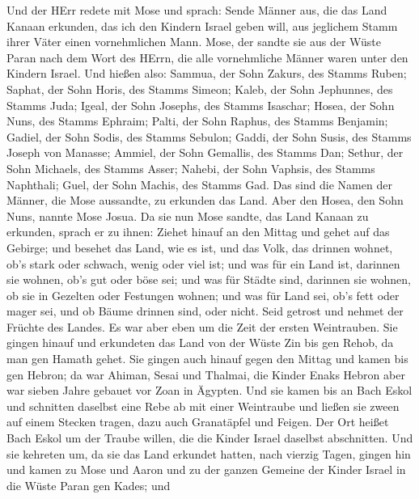  Und der HErr redete mit Mose und sprach:  Sende
Männer aus, die das Land Kanaan erkunden, das ich den Kindern Israel
geben will, aus jeglichem Stamm ihrer Väter einen vornehmlichen Mann.
 Mose, der sandte sie aus der Wüste Paran nach dem Wort des
HErrn, die alle vornehmliche Männer waren unter den Kindern Israel.
 Und hießen also: Sammua, der Sohn Zakurs, des Stamms Ruben;
 Saphat, der Sohn Horis, des Stamms Simeon; 
Kaleb, der Sohn Jephunnes, des Stamms Juda;  Igeal, der Sohn
Josephs, des Stamms Isaschar;  Hosea, der Sohn Nuns, des
Stamms Ephraim;  Palti, der Sohn Raphus, des Stamms
Benjamin;  Gadiel, der Sohn Sodis, des Stamms Sebulon;
 Gaddi, der Sohn Susis, des Stamms Joseph von Manasse;
 Ammiel, der Sohn Gemallis, des Stamms Dan; 
Sethur, der Sohn Michaels, des Stamms Asser;  Nahebi, der
Sohn Vaphsis, des Stamms Naphthali;  Guel, der Sohn Machis,
des Stamms Gad.  Das sind die Namen der Männer, die Mose
aussandte, zu erkunden das Land. Aber den Hosea, den Sohn Nuns, nannte
Mose Josua.  Da sie nun Mose sandte, das Land Kanaan zu
erkunden, sprach er zu ihnen: Ziehet hinauf an den Mittag und gehet auf
das Gebirge;  und besehet das Land, wie es ist, und das
Volk, das drinnen wohnet, ob's stark oder schwach, wenig oder viel ist;
 und was für ein Land ist, darinnen sie wohnen, ob's gut
oder böse sei; und was für Städte sind, darinnen sie wohnen, ob sie in
Gezelten oder Festungen wohnen;  und was für Land sei, ob's
fett oder mager sei, und ob Bäume drinnen sind, oder nicht. Seid getrost
und nehmet der Früchte des Landes. Es war aber eben um die Zeit der
ersten Weintrauben.  Sie gingen hinauf und erkundeten das
Land von der Wüste Zin bis gen Rehob, da man gen Hamath gehet.
 Sie gingen auch hinauf gegen den Mittag und kamen bis gen
Hebron; da war Ahiman, Sesai und Thalmai, die Kinder Enaks Hebron aber
war sieben Jahre gebauet vor Zoan in Ägypten.  Und sie
kamen bis an Bach Eskol und schnitten daselbst eine Rebe ab mit einer
Weintraube und ließen sie zween auf einem Stecken tragen, dazu auch
Granatäpfel und Feigen.  Der Ort heißet Bach Eskol um der
Traube willen, die die Kinder Israel daselbst abschnitten. 
Und sie kehreten um, da sie das Land erkundet hatten, nach vierzig
Tagen,  gingen hin und kamen zu Mose und Aaron und zu der
ganzen Gemeine der Kinder Israel in die Wüste Paran gen Kades; und
